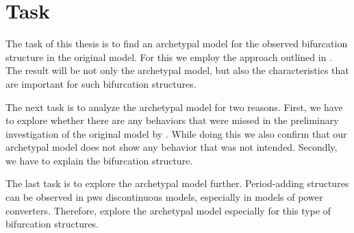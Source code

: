 \chapter{Task}
\label{chap:task}

The task of this thesis is to find an archetypal model for the observed bifurcation structure in the original model.
For this we employ the approach outlined in .
The result will be not only the archetypal model, but also the characteristics that are important for such bifurcation structures.

The next task is to analyze the archetypal model for two reasons.
First, we have to explore whether there are any behaviors that were missed in the preliminary investigation of the original model by .
While doing this we also confirm that our archetypal model does not show any behavior that was not intended.
Secondly, we have to explain the bifurcation structure.

The last task is to explore the archetypal model further.
Period-adding structures can be observed in \gls{pws} discontinuous models, especially in models of power converters.
Therefore, explore the archetypal model especially for this type of bifurcation structures.
